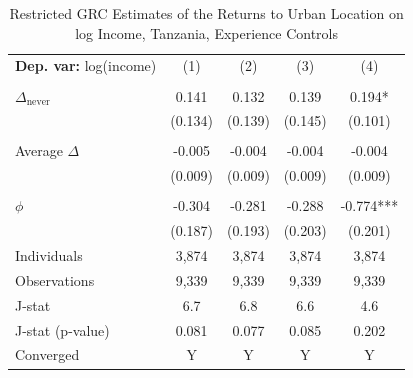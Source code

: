 \begin{table}[htbp] \centering \begin{threeparttable}
 \caption{Restricted GRC Estimates of the Returns to Urban Location on log Income, Tanzania, Experience Controls} 
 \label{tab:GRC_TZA_income_urban_unb_exp} 
\begin{tabular}{l cccc} \toprule  \textbf{Dep. var:}  log(income) 
                    &\multicolumn{1}{c}{(1)}   &\multicolumn{1}{c}{(2)}   &\multicolumn{1}{c}{(3)}   &\multicolumn{1}{c}{(4)}   \\
                    &               &               &               &               \\
\addlinespace
$\Delta_{\text{never}}$&       0.141   &       0.132   &       0.139   &       0.194*  \\
                    &     (0.134)   &     (0.139)   &     (0.145)   &     (0.101)   \\
                    &               &               &               &               \\
\addlinespace
Average $\Delta$    &      -0.005   &      -0.004   &      -0.004   &      -0.004   \\
                    &     (0.009)   &     (0.009)   &     (0.009)   &     (0.009)   \\
                    &               &               &               &               \\
\addlinespace
$\phi$              &      -0.304   &      -0.281   &      -0.288   &      -0.774***\\
                    &     (0.187)   &     (0.193)   &     (0.203)   &     (0.201)   \\
\addlinespace
Individuals         &       3,874   &       3,874   &       3,874   &       3,874   \\
Observations        &       9,339   &       9,339   &       9,339   &       9,339   \\
J-stat              &         6.7   &         6.8   &         6.6   &         4.6   \\
J-stat (p-value)    &       0.081   &       0.077   &       0.085   &       0.202   \\
Converged           &           Y   &           Y   &           Y   &           Y   \\

\end{tabular}
\end{threeparttable}
\end{table}
